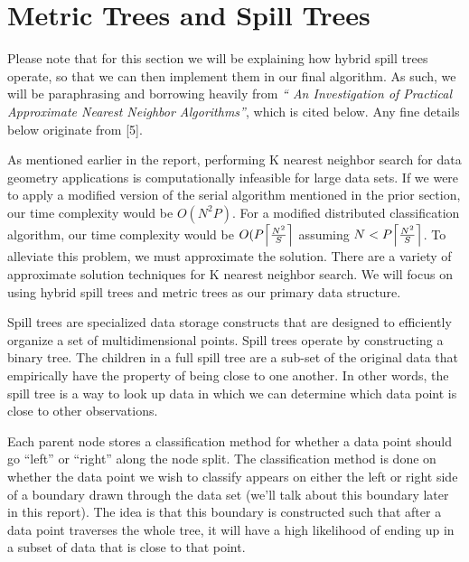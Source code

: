 \section{Metric Trees and Spill Trees}

\vspace{5 mm}
\noindent
Please note that for this section we will be explaining how hybrid spill 
trees operate, so that we can then implement them in our final algorithm. 
As such, we will be paraphrasing and borrowing heavily from  \textit{``
An Investigation of Practical Approximate Nearest Neighbor Algorithms''},
which is cited below.  Any fine details below originate from [5].

\vspace{5 mm}
\noindent
As mentioned earlier in the report, performing K nearest neighbor search for 
data geometry applications is computationally infeasible for large data sets. 
If we were to apply a modified version of the serial algorithm mentioned in the 
prior section, our time complexity would be $O(N^{2} P)$. For a modified 
distributed classification algorithm, our time complexity would be 
$O(P \ceil*{\frac{N^{2}}{S}}$ assuming $N < P \ceil*{\frac{N^{2}}{S}}$. 
To alleviate this problem, we must approximate the solution. There are a 
variety of approximate solution techniques for K nearest neighbor search. We 
will focus on using hybrid spill trees and metric trees as our primary data 
structure.

\vspace{5 mm}
\noindent
Spill trees are specialized data storage constructs that are designed to 
efficiently organize a set of multidimensional points.  Spill trees operate by 
constructing a binary tree. The children in a full spill tree are a sub-set of 
the original data that empirically have the property of being close to one 
another. In other words, the spill tree is a way to look up data in which we 
can determine which data point is close to other observations.

\vspace{5 mm}
\noindent
Each parent node stores a classification method for whether a data point should 
go ``left'' or ``right'' along the node split. The classification method is 
done on whether the data point we wish to classify appears on either the left 
or right side of a boundary drawn through the data set (we'll talk about this 
boundary later in this report). The idea is that this boundary is constructed 
such that after a data point traverses the whole tree, it will have a high 
likelihood of ending up in a subset of data that is close to that point.

